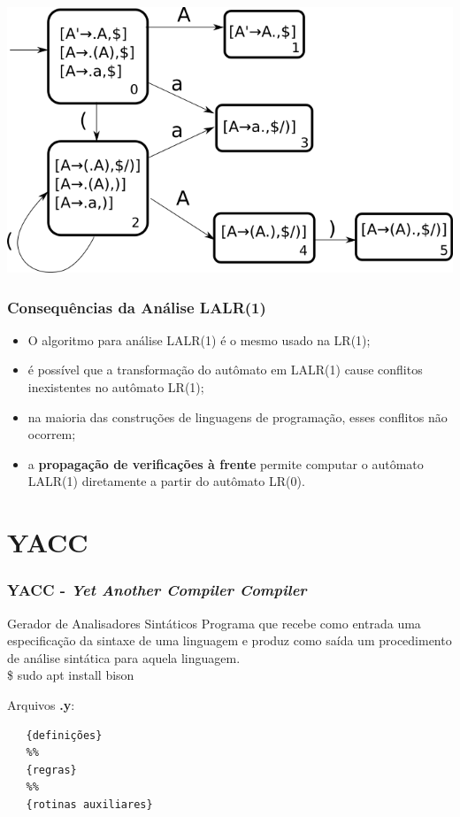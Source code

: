 \documentclass[table]{beamer}
\begin{document}
\begin{frame}
   \includegraphics[width=\linewidth,height=\textheight,keepaspectratio]{figuras/aadfalalr1.png}
\end{frame}

\begin{frame}
   \frametitle{Consequências da Análise LALR(1)}
   \begin{itemize}
      \item O algoritmo para análise LALR(1) é o mesmo usado na LR(1);
      \item é possível que a transformação do autômato em LALR(1) cause conflitos inexistentes no autômato LR(1);
      \item na maioria das construções de linguagens de programação, esses conflitos não ocorrem;
      \item a \textbf{propagação de verificações à frente} permite computar o autômato LALR(1) diretamente a partir do autômato LR(0).
   \end{itemize}
\end{frame}

\section{YACC}
\begin{frame}[fragile]
   \frametitle{YACC - \textit{Yet Another Compiler Compiler}}
   \begin{block}{Gerador de Analisadores Sintáticos}
   Programa que recebe como entrada uma especificação da sintaxe de uma linguagem e produz como saída um procedimento de análise sintática para aquela linguagem. \\
   \$ sudo apt install bison
   \end{block}
   Arquivos \textbf{.y}:
   \begin{verbatim}
   {definições}
   %%
   {regras}
   %%
   {rotinas auxiliares}
   \end{verbatim}
\end{frame}
\end{document}
